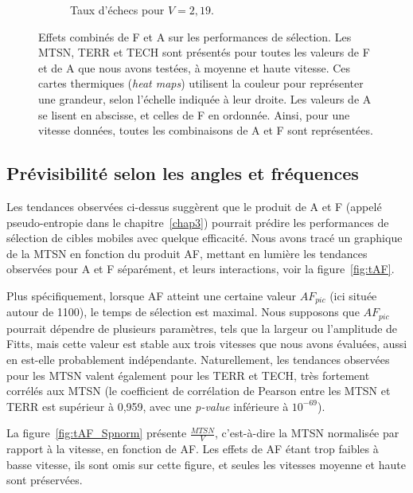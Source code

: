 \begin{figure}[!htb]
\begin{subfigure}[t]{\subImgWlineplot}
			\caption{Taux d'échecs pour $V = 2,19$.}
			\label{fig:hmap_f_219}
		\end{subfigure}
		\caption[Effets combinés de F et A sur les performances de sélection]{Effets combinés de F et A sur les performances de sélection. Les MTSN, TERR et TECH sont présentés pour toutes les valeurs de F et de A que nous avons testées, à moyenne et haute vitesse. Ces cartes thermiques (\emph{heat maps}) utilisent la couleur pour représenter une grandeur, selon l'échelle indiquée à leur droite. Les valeurs de A se lisent en abscisse, et celles de F en ordonnée. Ainsi, pour une vitesse données, toutes les combinaisons de A et F sont représentées.}
		\label{fig:hmaps}
	\end{figure}

	\subsection{Prévisibilité selon les angles et fréquences}
	Les tendances observées ci-dessus suggèrent que le produit de A et F (appelé pseudo-entropie dans le chapitre~\ref{chap3}) pourrait prédire les performances de sélection de cibles mobiles avec quelque efficacité. Nous avons tracé un graphique de la MTSN en fonction du produit AF, mettant en lumière les tendances observées pour A et F séparément, et leurs interactions, voir la figure~\ref{fig:tAF}.
	
	Plus spécifiquement, lorsque AF atteint une certaine valeur $AF_{pic}$ (ici située autour de 1100), le temps de sélection est maximal. Nous supposons que $AF_{pic}$ pourrait dépendre de plusieurs paramètres, tels que la largeur ou l'amplitude de Fitts, mais cette valeur est stable aux trois vitesses que nous avons évaluées, aussi en est-elle probablement indépendante. Naturellement, les tendances observées pour les MTSN valent également pour les TERR et TECH, très fortement corrélés aux MTSN (le coefficient de corrélation de Pearson entre les MTSN et TERR est supérieur à 0,959, avec une \emph{p-value} inférieure à $10^{-69}$).
	
	La figure~\ref{fig:tAF_Spnorm} présente $\frac{MTSN}{V}$, c'est-à-dire la MTSN normalisée par rapport à la vitesse, en fonction de AF. Les effets de AF étant trop faibles à basse vitesse, ils sont omis sur cette figure, et seules les vitesses moyenne et haute sont préservées.
	
